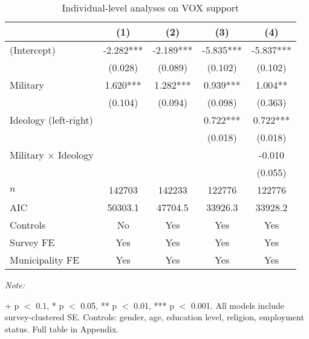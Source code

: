 \begin{table}[!h]

\caption{Individual-level analyses on VOX support\label{tab:survey_glm}}
\centering
\begin{threeparttable}
\begin{tabular}[t]{lcccc}
\toprule
  & (1) & (2) & (3) & (4)\\
\midrule
(Intercept) & -2.282*** & -2.189*** & -5.835*** & -5.837***\\
 & (0.028) & (0.089) & (0.102) & (0.102)\\
Military & 1.620*** & 1.282*** & 0.939*** & 1.004**\\
 & (0.104) & (0.094) & (0.098) & (0.363)\\
Ideology (left-right) &  &  & 0.722*** & 0.722***\\
 &  &  & (0.018) & (0.018)\\
Military $\times$ Ideology &  &  &  & -0.010\\
 &  &  &  & (0.055)\\
\midrule
$n$ & 142703 & 142233 & 122776 & 122776\\
AIC & 50303.1 & 47704.5 & 33926.3 & 33928.2\\
Controls & No & Yes & Yes & Yes\\
Survey FE & Yes & Yes & Yes & Yes\\
Municipality FE & Yes & Yes & Yes & Yes\\
\bottomrule
\end{tabular}
\begin{tablenotes}[para]
\item \textit{Note: } 
\item + p $<$ 0.1, * p $<$ 0.05, ** p $<$ 0.01, *** p $<$ 0.001. All models include survey-clustered SE. Controls: gender, age, education level, religion, employment status. Full table in Appendix.
\end{tablenotes}
\end{threeparttable}
\end{table}
